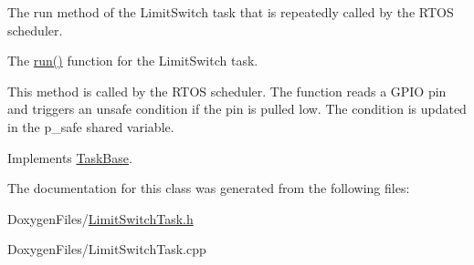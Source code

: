 The run method of the Limit\+Switch task that is repeatedly called by the R\+T\+OS scheduler. 

The {\ttfamily \mbox{\hyperlink{class_limit_switch_task_abf943a0f6ab5ab5fa9588f9cdbc6bc82}{run()}}} function for the Limit\+Switch task.

This method is called by the R\+T\+OS scheduler. The function reads a G\+P\+IO pin and triggers an unsafe condition if the pin is pulled low. The condition is updated in the p\+\_\+safe shared variable. 

Implements \mbox{\hyperlink{class_task_base_adcf6036ad9c860051ccf392ba5e7dbbc}{Task\+Base}}.



The documentation for this class was generated from the following files\+:\begin{DoxyCompactItemize}
\item 
Doxygen\+Files/\mbox{\hyperlink{_limit_switch_task_8h}{Limit\+Switch\+Task.\+h}}\item 
Doxygen\+Files/Limit\+Switch\+Task.\+cpp\end{DoxyCompactItemize}
